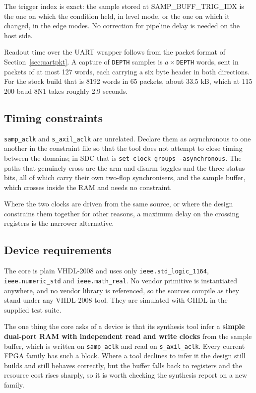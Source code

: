 \documentclass[twocolumn]{article}
\begin{document}
The trigger index is exact: the sample stored at SAMP\_BUFF\_TRIG\_IDX is the one on which the condition held, in level mode, or the one on which it changed, in the edge modes. No correction for pipeline delay is needed on the host side.

Readout time over the \acs{UART} wrapper follows from the packet format of Section~\ref{sec:uartpkt}. A capture of \texttt{DEPTH} samples is $a \times$\texttt{DEPTH} words, sent in packets of at most 127 words, each carrying a six byte header in both directions. For the stock build that is 8192 words in 65 packets, about 33.5 kB, which at 115\,200 baud 8N1 takes roughly 2.9 seconds.

\subsection{Timing constraints}
\texttt{samp\_aclk} and \texttt{s\_axil\_aclk} are unrelated. Declare them as asynchronous to one another in the constraint file so that the tool does not attempt to close timing between the domains; in \acs{SDC} that is \texttt{set\_clock\_groups -asynchronous}. The paths that genuinely cross are the arm and disarm toggles and the three status bits, all of which carry their own two-flop synchronisers, and the sample buffer, which crosses inside the RAM and needs no constraint.

Where the two clocks are driven from the same source, or where the design constrains them together for other reasons, a maximum delay on the crossing registers is the narrower alternative.

\subsection{Device requirements}
\label{sec:portability}
The core is plain VHDL-2008 and uses only \texttt{ieee.std\_logic\_1164}, \texttt{ieee.numeric\_std} and \texttt{ieee.math\_real}. No vendor primitive is instantiated anywhere, and no vendor library is referenced, so the sources compile as they stand under any VHDL-2008 tool. They are simulated with GHDL in the supplied test suite.

The one thing the core asks of a device is that its synthesis tool infer a \textbf{simple dual-port RAM with independent read and write clocks} from the sample buffer, which is written on \texttt{samp\_aclk} and read on \texttt{s\_axil\_aclk}. Every current FPGA family has such a block. Where a tool declines to infer it the design still builds and still behaves correctly, but the buffer falls back to registers and the resource cost rises sharply, so it is worth checking the synthesis report on a new family.
\end{document}
